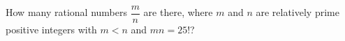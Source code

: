 How many rational numbers $\dfrac {m}{n}$ are there, where $m$ and $n$ are relatively prime positive integers with $m<n$ and $mn=25!$?
